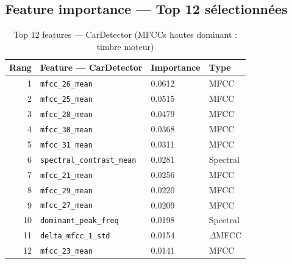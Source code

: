 \documentclass[11pt,a4paper]{article}
\newcommand{\code}[1]{\texttt{\small #1}}
\begin{document}
\subsection{Feature importance — Top 12 sélectionnées}

\begin{table}[htbp]
\centering
\begin{tabular}{@{}rlll@{}}
\toprule
\textbf{Rang} & \textbf{Feature — CarDetector} & \textbf{Importance} & \textbf{Type} \\
\midrule
1 & \code{mfcc\_26\_mean} & 0.0612 & MFCC \\
2 & \code{mfcc\_25\_mean} & 0.0515 & MFCC \\
3 & \code{mfcc\_28\_mean} & 0.0479 & MFCC \\
4 & \code{mfcc\_30\_mean} & 0.0368 & MFCC \\
5 & \code{mfcc\_31\_mean} & 0.0311 & MFCC \\
6 & \code{spectral\_contrast\_mean} & 0.0281 & Spectral \\
7 & \code{mfcc\_21\_mean} & 0.0256 & MFCC \\
8 & \code{mfcc\_29\_mean} & 0.0220 & MFCC \\
9 & \code{mfcc\_27\_mean} & 0.0209 & MFCC \\
10 & \code{dominant\_peak\_freq} & 0.0198 & Spectral \\
11 & \code{delta\_mfcc\_1\_std} & 0.0154 & $\Delta$MFCC \\
12 & \code{mfcc\_23\_mean} & 0.0141 & MFCC \\
\bottomrule
\end{tabular}
\caption{Top 12 features — CarDetector (MFCCs hautes dominant : timbre moteur)}
\end{table}
\end{document}
